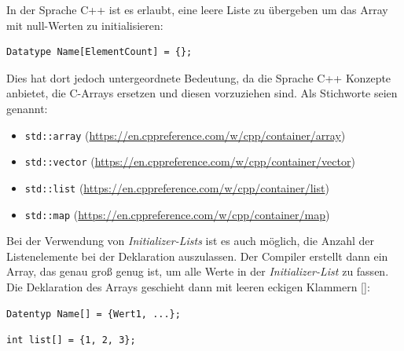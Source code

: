 \begin{plusbox}
In der Sprache C++ ist es erlaubt, eine leere Liste zu übergeben um das Array mit null-Werten zu initialisieren:

\vspace{5pt}
\begin{codebox}
\begin{verbatim}
Datatype Name[ElementCount] = {};
\end{verbatim}
\end{codebox}

Dies hat dort jedoch untergeordnete Bedeutung, da die Sprache C++ Konzepte anbietet, die C-Arrays ersetzen und diesen vorzuziehen sind. Als Stichworte seien genannt:
\begin{itemize}
\item \texttt{std::array}  (\url{https://en.cppreference.com/w/cpp/container/array})
\item \texttt{std::vector} (\url{https://en.cppreference.com/w/cpp/container/vector})
\item \texttt{std::list}   (\url{https://en.cppreference.com/w/cpp/container/list})
\item \texttt{std::map}    (\url{https://en.cppreference.com/w/cpp/container/map})
\end{itemize}
\end{plusbox}

Bei der Verwendung von \emph{Initializer-Lists} ist es auch möglich, die Anzahl der Listenelemente bei der Deklaration auszulassen. Der Compiler erstellt dann ein Array, das genau groß genug ist, um alle Werte in der \emph{Initializer-List} zu fassen. Die Deklaration des Arrays geschieht dann mit leeren eckigen Klammern []:

\begin{codebox}
\begin{verbatim}
Datentyp Name[] = {Wert1, ...};
\end{verbatim}
\end{codebox}

\begin{codebox}
\begin{verbatim}
int list[] = {1, 2, 3};
\end{verbatim}
\end{codebox}

